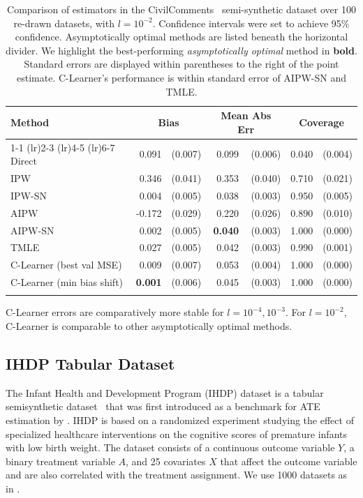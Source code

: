 \begin{table}[H]
\centering

\footnotesize
\begin{tabular}{lrrrrrr}
\toprule
Method & \multicolumn{2}{c}{Bias} & \multicolumn{2}{c}{Mean Abs Err} & \multicolumn{2}{c}{Coverage}\\ 
\cmidrule(lr){1-1}
\cmidrule(lr){2-3}
\cmidrule(lr){4-5}
\cmidrule(lr){6-7}
Direct & 0.091 & (0.007) & 0.099 & (0.006) & 0.040 & (0.004)\\
IPW & 0.346 & (0.041) & 0.353 & (0.040) & 0.710 & (0.021)\\
IPW-SN & 0.004 & (0.005) & 0.038 & (0.003) & 0.950 & (0.005)\\
\greymidrule
AIPW & -0.172 & (0.029) & 0.220 & (0.026) & 0.890 & (0.010)\\
AIPW-SN & 0.002 & (0.005) & \textbf{0.040} & (0.003) & 1.000 & (0.000)\\
TMLE & 0.027 & (0.005) & 0.042 & (0.003) & 0.990 & (0.001)\\
C-Learner (best val MSE) & 0.009 & (0.007) & 0.053 & (0.004) & 1.000 & (0.000)\\
C-Learner (min bias shift) & \textbf{0.001} & (0.006) & 0.045 & (0.003) & 1.000 & (0.000)\\
\bottomrule
\vspace{0.05em}
\end{tabular}
\caption{Comparison of estimators in the CivilComments~\citep{civilcomments} semi-synthetic dataset over 100 re-drawn datasets, with $l=10^{-2}$. Confidence intervals were set to achieve 95\% confidence. Asymptotically optimal methods are listed beneath the horizontal divider. We highlight the best-performing \emph{asymptotically optimal} method in \textbf{bold}. Standard errors are displayed within parentheses to the right of the point estimate. C-Learner's performance is within standard error of AIPW-SN and TMLE.}
    \label{tab:nn_2}
\end{table}
C-Learner errors are comparatively more stable for $l=10^{-4},10^{-3}$. For $l=10^{-2}$, C-Learner is comparable to other asymptotically optimal methods. 




\ifdefined\msom\else
\subsection{IHDP Tabular Dataset}
\label{sec:ihdp_experiment}
The Infant Health and Development Program (IHDP) dataset is a tabular semisynthetic dataset~\cite{brooks1992effects} that was first introduced as a benchmark for ATE estimation by \citet{hill2011bayesian}. IHDP is based on a randomized experiment studying the effect of specialized healthcare interventions on the cognitive scores of premature infants with low birth weight. The dataset consists of a continuous outcome variable $Y$, a binary treatment variable $A$, and 25 covariates $X$ that affect the outcome variable and are also correlated with the treatment assignment. We use 1000 datasets %
as in %
\cite{shi2019adapting,chernozhukov2022riesznet}.

